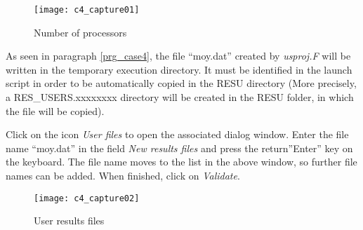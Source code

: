 \begin{figure}[h!]
\begin{center}
\texttt{[image: c4\_capture01]}
\caption{Number of processors}
\label{fig1_e4}
\end{center}
\end{figure}


\newpage
As seen in paragraph \ref{prg_case4}, the file ``moy.dat'' created by
{\itshape usproj.F} will be written in the temporary execution directory. It
must be identified in the launch script in order to be automatically copied in
the RESU directory (More precisely, a RES\_USERS.xxxxxxxx directory will be
created in the RESU folder, in which the file will be copied).

Click on the icon {\itshape User files} to open the associated dialog window.
Enter the file name ``moy.dat'' in the field {\itshape New results files}
and press the return''Enter'' key on the keyboard. The file name moves to the
list in the above window, so further file names can be added. When finished,
click on {\itshape Validate}.

\begin{figure}[h!]
\begin{center}
\texttt{[image: c4\_capture02]}
\caption{User results files}
\label{fig2_e4}
\end{center}
\end{figure}


